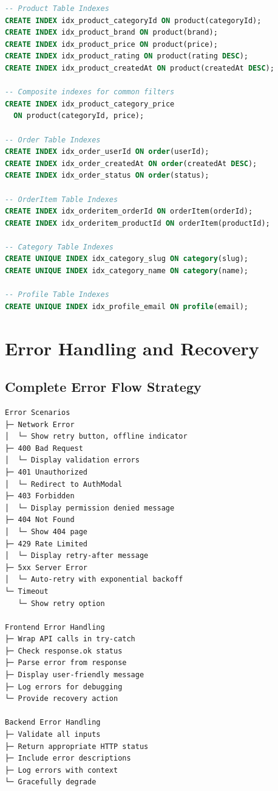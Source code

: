 \documentclass[12pt,a4paper]{report}
\begin{document}
\begin{lstlisting}[language=sql, caption=Database Index Configuration]
-- Product Table Indexes
CREATE INDEX idx_product_categoryId ON product(categoryId);
CREATE INDEX idx_product_brand ON product(brand);
CREATE INDEX idx_product_price ON product(price);
CREATE INDEX idx_product_rating ON product(rating DESC);
CREATE INDEX idx_product_createdAt ON product(createdAt DESC);

-- Composite indexes for common filters
CREATE INDEX idx_product_category_price 
  ON product(categoryId, price);

-- Order Table Indexes
CREATE INDEX idx_order_userId ON order(userId);
CREATE INDEX idx_order_createdAt ON order(createdAt DESC);
CREATE INDEX idx_order_status ON order(status);

-- OrderItem Table Indexes
CREATE INDEX idx_orderitem_orderId ON orderItem(orderId);
CREATE INDEX idx_orderitem_productId ON orderItem(productId);

-- Category Table Indexes
CREATE UNIQUE INDEX idx_category_slug ON category(slug);
CREATE UNIQUE INDEX idx_category_name ON category(name);

-- Profile Table Indexes
CREATE UNIQUE INDEX idx_profile_email ON profile(email);
\end{lstlisting}

\section{Error Handling and Recovery}

\subsection{Complete Error Flow Strategy}

\begin{lstlisting}[language=text, caption=Error Handling Flow]
Error Scenarios
├─ Network Error
│  └─ Show retry button, offline indicator
├─ 400 Bad Request
│  └─ Display validation errors
├─ 401 Unauthorized
│  └─ Redirect to AuthModal
├─ 403 Forbidden
│  └─ Display permission denied message
├─ 404 Not Found
│  └─ Show 404 page
├─ 429 Rate Limited
│  └─ Display retry-after message
├─ 5xx Server Error
│  └─ Auto-retry with exponential backoff
└─ Timeout
   └─ Show retry option

Frontend Error Handling
├─ Wrap API calls in try-catch
├─ Check response.ok status
├─ Parse error from response
├─ Display user-friendly message
├─ Log errors for debugging
└─ Provide recovery action

Backend Error Handling
├─ Validate all inputs
├─ Return appropriate HTTP status
├─ Include error descriptions
├─ Log errors with context
└─ Gracefully degrade
\end{lstlisting}
\end{document}
